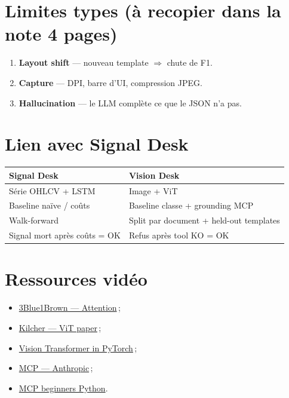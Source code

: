 \documentclass[11pt,a4paper]{article}
\begin{document}
\section{Limites types (à recopier dans la note 4 pages)}

\begin{enumerate}
  \item \textbf{Layout shift} --- nouveau template $\Rightarrow$ chute de F1.
  \item \textbf{Capture} --- DPI, barre d'UI, compression JPEG.
  \item \textbf{Hallucination} --- le LLM complète ce que le JSON n'a pas.
\end{enumerate}

\section{Lien avec Signal Desk}

\begin{center}
\renewcommand{\arraystretch}{1.15}
\begin{tabular}{@{}p{5.5cm}p{8.5cm}@{}}
\toprule
\textbf{Signal Desk} & \textbf{Vision Desk} \\
\midrule
Série OHLCV + LSTM & Image + ViT \\
Baseline naïve / coûts & Baseline classe + grounding MCP \\
Walk-forward & Split par document + held-out templates \\
Signal mort après coûts = OK & Refus après tool KO = OK \\
\bottomrule
\end{tabular}
\end{center}

\section{Ressources vidéo}

\begin{itemize}
  \item \href{https://www.youtube.com/watch?v=eMlx5fFNoYc}{3Blue1Brown --- Attention}\,;
  \item \href{https://www.youtube.com/watch?v=TrdevFK_am4}{Kilcher --- ViT paper}\,;
  \item \href{https://www.youtube.com/watch?v=ovB0ddFtzzA}{Vision Transformer in PyTorch}\,;
  \item \href{https://www.youtube.com/watch?v=CQywdSdi5iA}{MCP --- Anthropic}\,;
  \item \href{https://www.youtube.com/watch?v=LYfr7qusVSs}{MCP beginners Python}.
\end{itemize}
\end{document}
